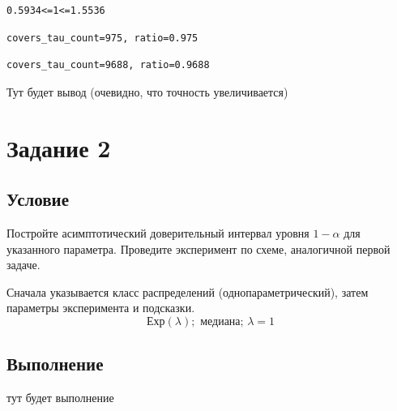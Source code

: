 \documentclass[a4paper, 12pt]{article}
\begin{document}
    \begin{lstlisting}[label=res1, caption={Посчитанный доверительный интервал}]
    0.5934<=1<=1.5536
    \end{lstlisting}


    \begin{lstlisting}[label=res1000cov, caption={Покрывает 95-\% для $n=1000$}]
    covers_tau_count=975, ratio=0.975
    \end{lstlisting}


    \begin{lstlisting}[label=res10000cov, caption={Покрывает 95-\% для $n=10000$}]
    covers_tau_count=9688, ratio=0.9688
    \end{lstlisting}


    Тут будет вывод (очевидно, что точность увеличивается)


    \section{Задание 2}
    \subsection{Условие}
    Постройте асимптотический доверительный интервал уровня $1-\alpha$ для указанного параметра.
    Проведите эксперимент по схеме, аналогичной первой задаче.
    
    
    Сначала указывается класс распределений (однопараметрический),
    затем параметры эксперимента и подсказки.
    $$\text{Ехр}(\lambda);\text{ медиана};\,\lambda=1$$


    \subsection{Выполнение}
    тут будет выполнение
\end{document}

